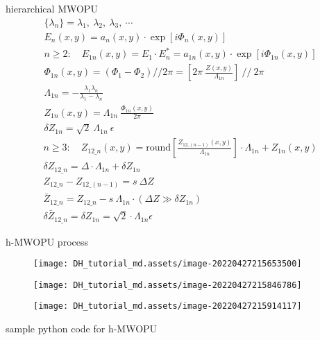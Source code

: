 \documentclass[t, aspectratio=169]{beamer}
\begin{document}
\begin{frame}[allowframebreaks]{hierarchical MWOPU}
\begin{gather*}
\{\lambda_n\} = \lambda_1,\ \lambda_2,\ \lambda_3,\ \cdots \\
E_n(x,y) = a_n(x,y)\cdot\exp[i\Phi_n(x,y)] \\
n \ge 2:\quad E_{1n}(x,y) = E_1\cdot E_n^* = a_{1n}(x,y)\cdot\exp[i\Phi_{1n}(x,y)] \\
\Phi_{1n}(x,y) = (\Phi_1 - \Phi_2)//2\pi = \left[ 2\pi\ \frac{Z(x,y)}{\Lambda_{1n}} \right]\ //\ 2\pi \\
\Lambda_{1n} = -\frac{\lambda_1\lambda_n}{\lambda_1 - \lambda_n} \\
Z_{1n}(x,y) = \Lambda_{1n}\ \frac{\Phi_{1n}(x,y)}{2\pi} \\
\delta Z_{1n} = \sqrt{2}\ \Lambda_{1n}\ \epsilon 
\end{gather*}
\begin{gather*}
n \ge 3:\quad Z_{12\_n}(x,y) = \textrm{round}\left[\frac{Z_{12\_(n-1)}(x,y)}{\Lambda_{1n}} \right]\cdot\Lambda_{1n} + Z_{1n}(x,y) \\
\delta Z_{12\_n} = \Delta\cdot\Lambda_{1n} + \delta Z_{1n} \\
Z_{12\_n} - Z_{12\_(n-1)} = s\ \Delta Z \\
\bar{Z}_{12\_n} = Z_{12\_n} - s\ \Lambda_{1n}\cdot(\Delta Z \gg \delta Z_{1n}) \\
\delta\bar{Z}_{12\_n} = \delta Z_{1n} = \sqrt{2}\cdot\Lambda_{1n}\epsilon
\end{gather*}
\end{frame}


\begin{frame}[allowframebreaks]{h-MWOPU process}
\begin{figure}
	\texttt{[image: DH\_tutorial\_md.assets/image-20220427215653500]}
\end{figure}
\begin{figure}
	\texttt{[image: DH\_tutorial\_md.assets/image-20220427215846786]}
\end{figure}
\begin{figure}
	\texttt{[image: DH\_tutorial\_md.assets/image-20220427215914117]}
\end{figure}
\end{frame}


\begin{frame}{sample python code for h-MWOPU}

\end{frame}
\end{document}
